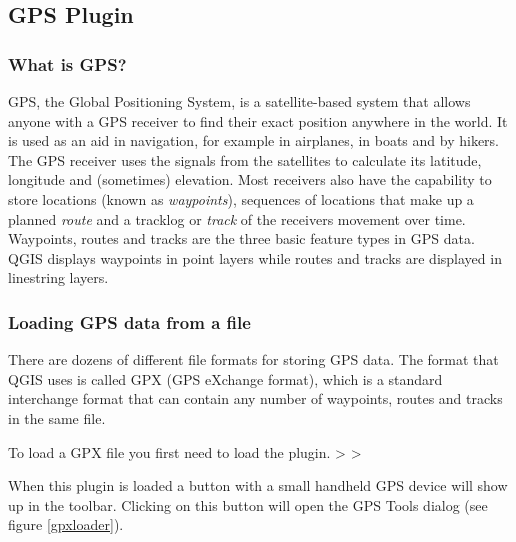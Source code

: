 \subsection{GPS Plugin}\label{label_plugingps}

\updatedisclaimer

\subsubsection{What is GPS?}\label{whatsgps}

GPS, the Global Positioning System, is a satellite-based system that allows anyone with a GPS receiver to find their exact position anywhere in the world.
It is used as an aid in navigation, for example in airplanes, in boats and by hikers.
The GPS receiver uses the signals from the satellites to calculate its latitude, longitude and (sometimes) elevation.
Most receivers also have the capability to store locations (known as \emph{waypoints}), sequences of locations that make up a planned \emph{route} and a tracklog or \emph{track} of the receivers movement over time.
Waypoints, routes and tracks are the three basic feature types in GPS data.
QGIS displays waypoints in point layers while routes and tracks are displayed in linestring layers.

\subsubsection{Loading GPS data from a file}\label{label_loadgps}

There are dozens of different file formats for storing GPS data.
The format that QGIS uses is called GPX (GPS eXchange format), which is a standard interchange format that can contain any number of waypoints, routes and tracks in the same file.

To load a GPX file you first need to load the plugin.
 >  > 

When this plugin is loaded a button with a small handheld GPS device will show up in the toolbar.
Clicking on this button  will open the GPS Tools dialog (see figure \ref{gpxloader}).


